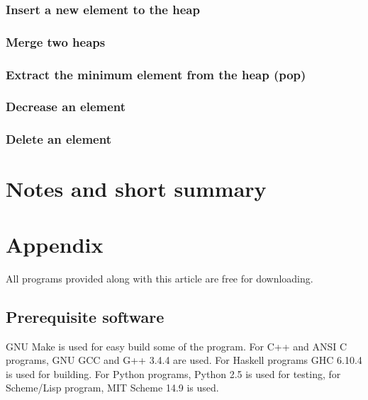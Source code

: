 \documentclass{article}
\begin{document}
\subsubsection{Insert a new element to the heap}

\subsubsection{Merge two heaps}

\subsubsection{Extract the minimum element from the heap (pop)}

\subsubsection{Decrease an element}

\subsubsection{Delete an element}

\section{Notes and short summary}

\section{Appendix} \label{appendix}
All programs provided along with this article are free for
downloading.

\subsection{Prerequisite software}
GNU Make is used for easy build some of the program. For C++ and ANSI C programs,
GNU GCC and G++ 3.4.4 are used. 
For Haskell programs GHC 6.10.4 is used
for building. For Python programs, Python 2.5 is used for testing, for
Scheme/Lisp program, MIT Scheme 14.9 is used.
\end{document}
